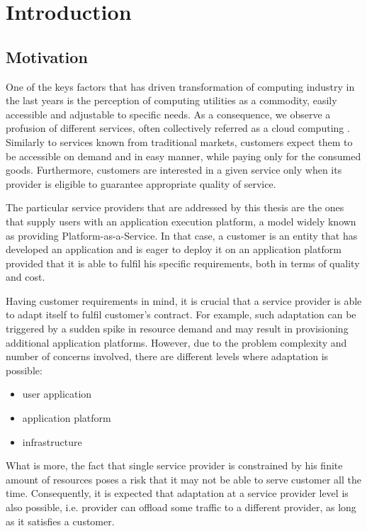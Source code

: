 \chapter{Introduction}

\section{Motivation}
One of the keys factors that has driven transformation of computing industry in the last years is the perception of computing utilities as a commodity\cite{BuYeVeBrBr09}, easily accessible and adjustable to specific needs. As a consequence, we observe a profusion of different services, often collectively referred as a cloud computing \cite{MeGr11}. Similarly to services known from traditional markets, customers expect them to be accessible on demand and in easy manner, while paying only for the consumed goods. Furthermore, customers are interested in a given service only when its provider is eligible to guarantee appropriate quality of service.

The particular service providers that are addressed by this thesis are the ones that supply users with an application execution platform, a model widely known as providing Platform-as-a-Service. In that case, a customer is an entity that has developed an application and is eager to deploy it on an application platform provided that it is able to fulfil his specific requirements, both in terms of quality and cost.

Having customer requirements in mind, it is crucial that a service provider is able to adapt itself to fulfil customer's contract. For example, such adaptation can be triggered by a sudden spike in resource demand and may result in provisioning additional application platforms. However, due to the problem complexity and number of concerns involved, there are different levels where adaptation is possible:
\begin{itemize}
	\item user application
	\item application platform
	\item infrastructure
\end{itemize}
What is more, the fact that single service provider is constrained by his finite amount of resources poses a risk that it may not be able to serve customer all the time. Consequently, it is expected that adaptation at a service provider level is also possible, i.e. provider can offload some traffic to a different provider, as long as it satisfies a customer.

